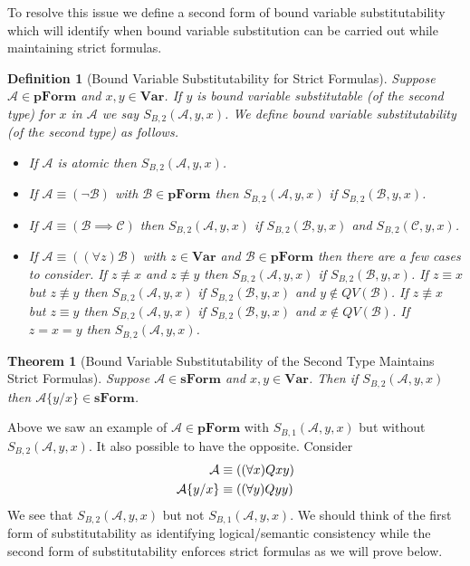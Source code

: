\documentclass[12pt]{article}
\theoremstyle{break}
\newtheorem{definition}{Definition}[section]
\theoremstyle{break}
\newtheorem{theorem}{Theorem}[section]
\theoremstyle{break}
\theoremstyle{break}
\theoremstyle{break}
\newtheorem{informal definition}[definition]{Informal Definition}
\newcommand{\mc}[1]{\mathcal{#1}}
\begin{document}
To resolve this issue we define a second form of bound variable substitutability which will identify when bound variable substitution can be carried out while maintaining strict formulas.

\begin{definition}[Bound Variable Substitutability for Strict Formulas]
Suppose $\mc{A}\in\textbf{pForm}$ and $x, y\in\textbf{Var}$.
If $y$ is bound variable substitutable (of the second type) for $x$ in $\mc{A}$ we say $S_{B,2}(\mc{A}, y, x)$.
We define bound variable substitutability (of the second type) as follows.
\begin{itemize}
\item{If $\mc{A}$ is atomic then $S_{B,2}(\mc{A}, y, x)$.}
\item{If $\mc{A}\equiv (\lnot \mc{B})$ with $\mc{B}\in\textbf{pForm}$ then $S_{B,2}(\mc{A}, y, x)$ if $S_{B,2}(\mc{B}, y, x)$.}
\item{If $\mc{A}\equiv(\mc{B}\implies \mc{C})$ then $S_{B,2}(\mc{A}, y, x)$ if $S_{B,2}(\mc{B}, y, x)$ and $S_{B,2}(\mc{C}, y, x)$.}
\item{If $\mc{A} \equiv ((\forall z)\mc{B})$ with $z\in \textbf{Var}$ and $\mc{B}\in\textbf{pForm}$ then there are a few cases to consider. If $z\not \equiv x$ and $z\not \equiv y$ then $S_{B,2}(\mc{A}, y, x)$ if $S_{B,2}(\mc{B}, y, x)$.
If $z\equiv x$ but $z\not \equiv y$ then $S_{B,2}(\mc{A}, y, x)$ if $S_{B,2}(\mc{B}, y, x)$ and $y\not \in QV(\mc{B})$. If $z \not \equiv x$ but $z\equiv y$ then $S_{B,2}(\mc{A}, y, x)$ if $S_{B,2}(\mc{B}, y, x)$ and $x\not \in QV(\mc{B})$. If $z=x=y$ then $S_{B,2}(\mc{A}, y, x)$.}
\end{itemize}
\end{definition}

\begin{theorem}[Bound Variable Substitutability of the Second Type Maintains Strict Formulas]
Suppose $\mc{A}\in\textbf{sForm}$ and $x,y\in\textbf{Var}$.
Then if $S_{B,2}(\mc{A}, y, x)$ then $\mc{A}\{y/x\}\in\textbf{sForm}$.
\end{theorem}

Above we saw an example of $\mc{A}\in\textbf{pForm}$ with $S_{B,1}(\mc{A}, y, x)$ but without $S_{B,2}(\mc{A}, y, x)$.
It also possible to have the opposite.
Consider
\begin{align}
\mc{A} &\equiv ((\forall x) Qxy)\notag\\
\mc{A}\{y/x\} &\equiv ((\forall y) Qyy) \notag
\end{align}
We see that $S_{B,2}(\mc{A}, y, x)$ but not $S_{B,1}(\mc{A}, y, x)$.
We should think of the first form of substitutability as identifying logical/semantic consistency while the second form of substitutability enforces strict formulas as we will prove below.
\end{document}
